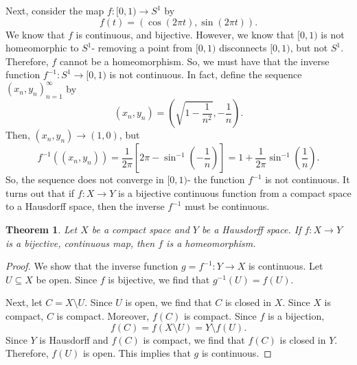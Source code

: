 \documentclass[a4paper, openany]{memoir}
\theoremstyle{definition}
\theoremstyle{plain}
\newtheorem{theorem}[definition]{Theorem}
\begin{document}
Next, consider the map $f: [0, 1) \to S^1$ by 
\[f(t) = (\cos (2\pi t), \sin (2\pi t)).\]
We know that $f$ is continuous, and bijective. However, we know that $[0, 1)$ is not homeomorphic to $S^1$- removing a point from $[0, 1)$ disconnects $[0, 1)$, but not $S^1$. Therefore, $f$ cannot be a homeomorphism. So, we must have that the inverse function $f^{-1}: S^1 \to [0, 1)$ is not continuous. In fact, define the sequence $(x_n, y_n)_{n=1}^{\infty}$ by
\[(x_n, y_n) = \left(\sqrt{1 - \frac{1}{n^2}}, -\frac{1}{n} \right).\]
Then, $(x_n, y_n) \to (1, 0)$, but
\[f^{-1}((x_n, y_n)) = \frac{1}{2\pi} \left[ 2\pi - \sin^{-1} \left(-\frac{1}{n}\right) \right] = 1 + \frac{1}{2\pi} \sin^{-1} \left(\frac{1}{n}\right).\]
So, the sequence does not converge in $[0, 1)$- the function $f^{-1}$ is not continuous. It turns out that if $f: X \to Y$ is a bijective continuous function from a compact space to a Hausdorff space, then the inverse $f^{-1}$ must be continuous.
\begin{theorem}
Let $X$ be a compact space and $Y$ be a Hausdorff space. If $f: X \to Y$ is a bijective, continuous map, then $f$ is a homeomorphism.
\end{theorem}
\begin{proof}
We show that the inverse function $g = f^{-1}: Y \to X$ is continuous. Let $U \subseteq X$ be open. Since $f$ is bijective, we find that $g^{-1}(U) = f(U)$.

\noindent Next, let $C = X \setminus U$. Since $U$ is open, we find that $C$ is closed in $X$. Since $X$ is compact, $C$ is compact. Moreover, $f(C)$ is compact. Since $f$ is a bijection, 
\[f(C) = f(X \setminus U) = Y \setminus f(U).\]
Since $Y$ is Hausdorff and $f(C)$ is compact, we find that $f(C)$ is closed in $Y$. Therefore, $f(U)$ is open. This implies that $g$ is continuous.
\end{proof}
\newpage
\end{document}
